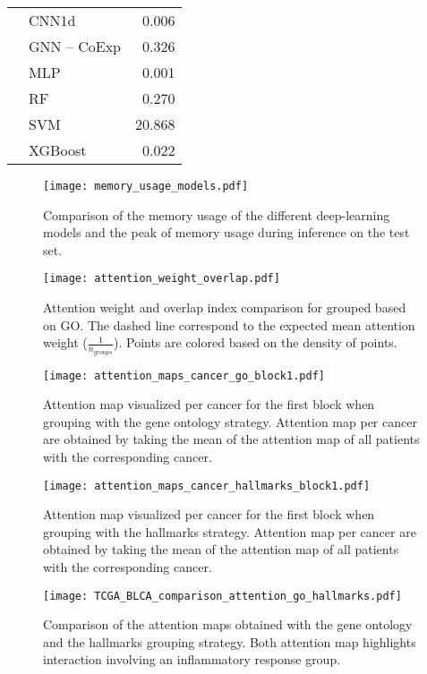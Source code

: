 \begin{table}[htbp]
\begin{tabular}{llr}
		                          & CNN1d                 & 0.006    \\
		                          & GNN – CoExp           & 0.326    \\
		                          & MLP                   & 0.001    \\
		                          & RF                    & 0.270    \\
		                          & SVM                   & 20.868   \\
		                          & XGBoost               & 0.022    \\
		\bottomrule
	\end{tabular}
\end{table}

\begin{figure}[htbp]
	\centering
	\texttt{[image: memory\_usage\_models.pdf]}
	\caption{Comparison of the memory usage of the different deep-learning models and the peak of memory usage during inference on the test set.}
	\label{fig:mem_uasge}
\end{figure}



\begin{figure}[htbp]
	\centering
	\texttt{[image: attention\_weight\_overlap.pdf]}
	\caption{Attention weight and overlap index comparison for grouped based on GO\@. The dashed line correspond to the expected mean attention weight (\(\frac{1}{n_{groups}} \)). Points are colored based on the density of points.}
	\label{fig:att_w_overlap}
\end{figure}

\begin{landscape}
	\begin{figure}[p]
		\centering
		\texttt{[image: attention\_maps\_cancer\_go\_block1.pdf]}
		\caption{Attention map visualized per cancer for the first block when grouping with the gene ontology strategy. Attention map per cancer are obtained by taking the mean of the attention map of all patients with the corresponding cancer. }
		\label{fig:att_map_cancer_go}
	\end{figure}

	\begin{figure}[p]
		\centering
		\texttt{[image: attention\_maps\_cancer\_hallmarks\_block1.pdf]}
		\caption{Attention map visualized per cancer for the first block when grouping with the hallmarks strategy. Attention map per cancer are obtained by taking the mean of the attention map of all patients with the corresponding cancer. }
		\label{fig:att_map_cancer_hallmarks}
	\end{figure}

	\begin{figure}[p]
		\centering
		\texttt{[image: TCGA\_BLCA\_comparison\_attention\_go\_hallmarks.pdf]}
		\caption{Comparison of the attention maps obtained with the gene ontology and the hallmarks grouping strategy. Both attention map highlights interaction involving an inflammatory response group. }
		\label{fig:att_map_blca_comp}
	\end{figure}
\end{landscape}